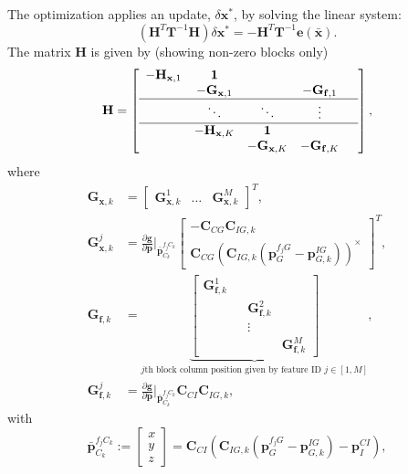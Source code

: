 \documentclass[letterpaper, 10 pt, conference]{ieeeconf}  %
\def\Vec#1{\mathbf{#1}}
\newcommand{\bbm}{\begin{bmatrix}}
\newcommand{\ebm}{\end{bmatrix}}
\newcommand{\pd}[2]{\frac{\partial #1}{\partial #2}}
\begin{document}
The optimization applies an update, $ \delta \Vec{x}^*$, by solving the linear system:
\begin{equation}
\label{eqn:gnOpt}
(\Vec H^T \Vec T ^{-1} \Vec H ) \delta \Vec{x}^*  = - \Vec{H}^T\Vec{T}^{-1}\Vec{e}(\bar{\Vec{x}}).
\end{equation}
The matrix $\Vec{H}$ is given by (showing non-zero blocks only)
\begin{equation}
\mathbf{H} = \left[\begin{array}{cccccc}
 -\Vec H_{\Vec x, 1} & \Vec 1 & & &   \\ 
 & -\Vec G_{\Vec x, 1} &  &   -\Vec G_{\Vec f, 1} \\ \hline
 & \ddots & \ddots & \vdots  \\  \hline
 & -\Vec H_{\Vec x, K} & \Vec 1 & \\ 
 & & -\Vec G_{\Vec x, K} &  -\Vec G_{\Vec f, K}   \\  
\end{array}\right], 
\end{equation}
where
\begin{align}
\Vec G_{\Vec x, k} &= \bbm \Vec G_{\Vec x, k}^1 & \hdots & \Vec G_{\Vec x, k}^M \ebm ^T,
\\[0.5em]
\Vec G_{\Vec{x}, k}^j &= \pd{\Vec g}{ \Vec p}\Bigr|_{\bar{\Vec p}_{C_k}^{f_j C_k}}
    \bbm -\Vec C_{CG} \Vec C_{IG,k} \\[0.5em] \Vec C_{CG} (\Vec C_{IG,k} (\Vec{p}_G^{f_j G} - \Vec p_{G,k}^{IG} ) )^\times  \ebm ^T,
\\[0.5em]
\Vec G_{\Vec f, k} &= \underbrace{\bbm \Vec G_{\Vec f, k}^1 & & \\ & & \Vec G_{\Vec f, k}^2 & \\ & & \vdots &  \\ & & & \Vec G_{\Vec f, k}^M \ebm}_{\text{$j$th block column position given by feature ID $j\in[1,M]$}}, \\[0.5em]
\Vec G_{\Vec f, k}^j &= \pd{\Vec g}{ \Vec p}\Bigr|_{\bar{\Vec p}_{C_k}^{f_j C_k}} \Vec C_{CI} \Vec C_{IG,k},
\end{align}
with
\begin{equation}
\bar{\Vec p}_{C_k}^{f_j C_k} := \bbm x \\ y \\ z \ebm = \Vec C_{CI} \left( \Vec C_{IG,k} (\Vec{p}_G^{f_j G} - \Vec{p}_{G,k}^{IG} )   - \Vec p_I^{CI} \right),
\end{equation}
\end{document}
